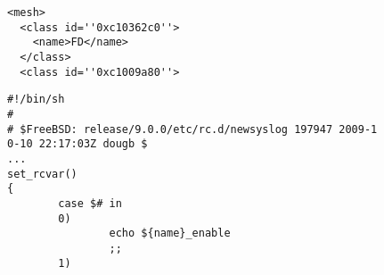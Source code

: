 \begin{verbatim}
<mesh>
  <class id=''0xc10362c0''>
    <name>FD</name>
  </class>
  <class id=''0xc1009a80''>
\end{verbatim}

\begin{verbatim}
#!/bin/sh
#
# $FreeBSD: release/9.0.0/etc/rc.d/newsyslog 197947 2009-1
0-10 22:17:03Z dougb $
...
set_rcvar()
{
        case $# in
        0)
                echo ${name}_enable
                ;;
        1)
\end{verbatim}
